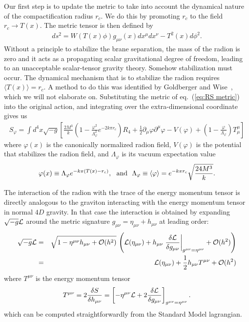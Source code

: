 \documentclass[12pt]{article}
\def\beq{\begin{eqnarray}}
\def\eeq{\end{eqnarray}}
\def\bea{\begin{eqnarray}}
\def\eea{\end{eqnarray}}
\def\eq#1{eq.~(\ref{#1})}
\begin{document}
Our first step is to update the metric to take into account the dynamical nature of the compactification radius $r_c$. We do this by promoting $r_c$ to the field $r_c\to T(x)$.  The metric tensor is then defined by
\beq
ds^2=W(T(x)\phi)g_{\mu\nu}(x)dx^\mu dx^\nu-T^2(x)d\phi^2.
\label{eq:RS metric}
\eeq
Without a principle to stabilize the brane separation, the mass of the radion is zero and it acts as a propagating scalar gravitational degree of freedom, leading to an unacceptable scalar-tensor gravity theory. Somehow stabilization must occur.
The dynamical mechanism that is to stabilize the radion requires $\langle T(x)\rangle=r_c$. A method to do this was identified by Goldberger and Wise~\cite{Goldberger:1999uk}, which we will not elaborate on. Substituting the metric of \eq{eq:RS metric} into the original action, and integrating over the extra-dimensional coordinate gives us
\beq
S_{\varphi}=\int d^4x\sqrt{-g}\left[ \frac{2M^3}{k}\left( 1-\frac{\varphi^2}{\Lambda_\varphi^2}e^{-2k\pi r_c}\right) R_4
+\frac{1}{2}\partial_\mu \varphi\partial^\mu \varphi-V(\varphi)+\left( 1-\frac{\varphi}{\Lambda_\varphi}\right) T^\mu_\mu\right] \nonumber
\eeq
where $\varphi(x)$ is the canonically normalized radion field, $V(\varphi)$ is the potential that stabilizes the radion field, and $\Lambda_\varphi$ is its vacuum expectation value
\beq
\varphi(x)\equiv \Lambda_\varphi e^{-k\pi(T(x)-r_c)},~~{\rm and}~~
\Lambda_\varphi \equiv \langle \varphi\rangle =e^{-k\pi r_c}\sqrt{\frac{24M^3}{k}}.
\eeq

The interaction of the radion with the trace of the energy momentum tensor is directly analogous to the graviton interacting with the energy momentum tensor in normal $4D$ gravity.  In that case the interaction is obtained by expanding $\sqrt{-g}{\cal L}$ around the metric signature $g_{\mu\nu}=\eta_{\mu\nu}+h_{\mu\nu}$ at leading order:
\bea
\sqrt{-g}{\cal L}& = &\sqrt{1-\eta^{\mu\nu}h_{\mu\nu}+{\cal O}(h^2)}\, \left({\cal L}(\eta_{\mu\nu})+
 h_{\mu\nu} \left. \frac{\delta {\cal L}}{\delta g_{\mu\nu}}\right|_{g^{\mu\nu}=\eta^{\mu\nu}} +{\cal O}(h^2)\right) \nonumber \\
& = & {\cal L}(\eta_{\mu\nu})+\frac{1}{2}h_{\mu\nu}T^{\mu\nu}
 +{\cal O}(h^2)
\eea
where $T^{\mu\nu}$ is the energy momentum tensor 
\beq
T^{\mu\nu}={2}\frac{\delta S}{\delta h_{\mu\nu}}= \left[
-\eta^{\mu\nu}{\cal L} +2 \frac{\delta {\cal L}}{\delta g_{\mu\nu}}\right]_{g^{\mu\nu}=\eta^{\mu\nu}}.
\eeq
which can be computed straightforwardly from the Standard Model lagrangian.
\end{document}
